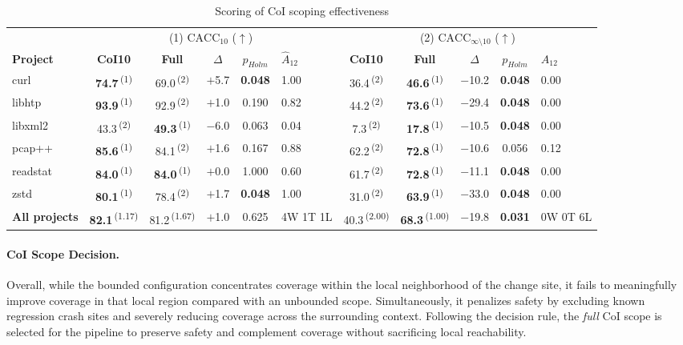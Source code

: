 \begin{table}
  \centering
  \def\rk#1{\,\textsuperscript{(#1)}}%
  \def\hd#1{\multicolumn{5}{c}{#1}}%
  \begin{threeparttable}
    \footnotesize
    \setlength{\tabcolsep}{3pt}
    \begin{tabular*}{\textwidth}{@{\extracolsep{\fill}}l cc c S[table-format=1.3] l cc c S[table-format=1.3] l@{}}
       & \hd{(1) $\mathrm{CACC}_{10}$ ($\uparrow$)} & \hd{(2) $\mathrm{CACC}_{\infty \setminus 10}$ ($\uparrow$)} \\
      \cmidrule(lr){2-6}\cmidrule(lr){7-11}
      \textbf{Project} & \textbf{CoI10} & \textbf{Full} & \textbf{$\Delta$} & {\textbf{$p_{Holm}$}} & {\textbf{$\hat A_{12}$}} & \textbf{CoI10} & \textbf{Full} & \textbf{$\Delta$} & {\textbf{$p_{Holm}$}} & {\textbf{$\hat A_{12}$}} \\
      \midrule
      curl & \textbf{74.7}\rk{1} & 69.0\rk{2} & $+$5.7 & {\textbf{0.048}} & 1.00 & 36.4\rk{2} & \textbf{46.6}\rk{1} & $-$10.2 & {\textbf{0.048}} & 0.00 \\
      libhtp & \textbf{93.9}\rk{1} & 92.9\rk{2} & $+$1.0 & 0.190 & 0.82 & 44.2\rk{2} & \textbf{73.6}\rk{1} & $-$29.4 & {\textbf{0.048}} & 0.00 \\
      libxml2 & 43.3\rk{2} & \textbf{49.3}\rk{1} & $-$6.0 & 0.063 & 0.04 & 7.3\rk{2} & \textbf{17.8}\rk{1} & $-$10.5 & {\textbf{0.048}} & 0.00 \\
      pcap++ & \textbf{85.6}\rk{1} & 84.1\rk{2} & $+$1.6 & 0.167 & 0.88 & 62.2\rk{2} & \textbf{72.8}\rk{1} & $-$10.6 & 0.056 & 0.12 \\
      readstat & \textbf{84.0}\rk{1} & \textbf{84.0}\rk{1} & $+$0.0 & 1.000 & 0.60 & 61.7\rk{2} & \textbf{72.8}\rk{1} & $-$11.1 & {\textbf{0.048}} & 0.00 \\
      zstd & \textbf{80.1}\rk{1} & 78.4\rk{2} & $+$1.7 & {\textbf{0.048}} & 1.00 & 31.0\rk{2} & \textbf{63.9}\rk{1} & $-$33.0 & {\textbf{0.048}} & 0.00 \\
      \midrule
      \textbf{All projects} & \textbf{82.1}\rk{1.17} & 81.2\rk{1.67} & $+$1.0 & 0.625 & 4W 1T 1L & 40.3\rk{2.00} & \textbf{68.3}\rk{1.00} & $-$19.8 & {\textbf{0.031}} & 0W 0T 6L \\
      \bottomrule
    \end{tabular*}
    \caption{Scoring of \ac{CoI} scoping effectiveness}
    \label{tab:coi_scope_score}
  \end{threeparttable}
\end{table}

\paragraph{\ac{CoI} Scope Decision.}
Overall, while the bounded configuration concentrates coverage within the local neighborhood of the change site, it fails to meaningfully improve coverage in that local region compared with an unbounded scope.
Simultaneously, it penalizes safety by excluding known regression crash sites and severely reducing coverage across the surrounding context.
Following the decision rule, the \emph{full} \ac{CoI} scope is selected for the pipeline to preserve safety and complement coverage without sacrificing local reachability.

